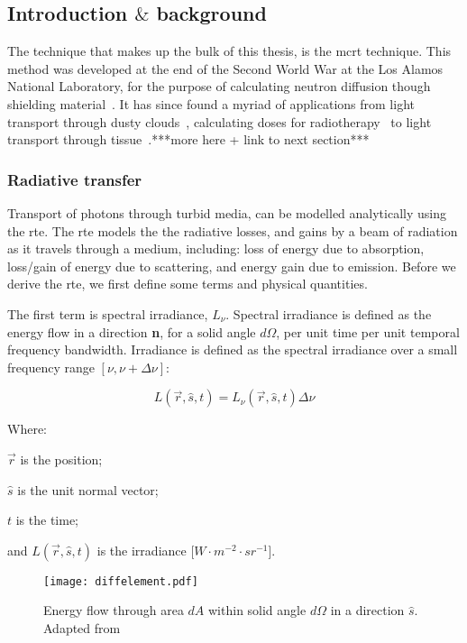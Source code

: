 \subsection{Introduction \texorpdfstring{$\&$}{and} background}
The technique that makes up the bulk of this thesis, is the \gls{mcrt} technique. This method was developed at the end of the Second World War at the Los Alamos National Laboratory, for the purpose of calculating neutron diffusion though shielding material~\cite{montybeg1,eckhardt1987stan,anderson1986metropolis,ulam1947statistical}. It has since found a myriad of applications from light transport through dusty clouds~\cite{wood1999model}, calculating doses for radiotherapy~\cite{rogers1995beam} to light transport through tissue~\cite{1stmonty}.***more here + link to next section***



\subsubsection*{Radiative transfer}
Transport of photons through turbid media, can be modelled analytically using the \gls{rte}. The \gls{rte} models the the radiative losses, and gains by a beam of radiation as it travels through a medium, including: loss of energy due to absorption, loss/gain of energy due to scattering, and energy gain due to emission. Before we derive the \gls{rte}, we first define some terms and physical quantities.


The first term is spectral irradiance, $L_\nu$. Spectral irradiance is defined as the energy flow in a direction \textbf{n}, for a solid angle $d\Omega$, per unit time per unit temporal frequency bandwidth.	
Irradiance is defined as the spectral irradiance over a small frequency range $[\nu, \nu+\Delta \nu]$:

\begin{equation}
	L(\vec{r},\hat{s},t) = L_{\nu}(\vec{r},\hat{s},t)\Delta \nu	
\end{equation}

\noindent Where:

\indent $\vec{r}$ is the position;

\indent $\hat{s}$ is the unit normal vector;

\indent $t$ is the time;

\indent and $L(\vec{r},\hat{s},t)$ is the irradiance [$W \cdot m^{-2}\cdot sr^{-1}$].

\medskip

\begin{figure}[!htb]
	\centering
	\texttt{[image: diffelement.pdf]}
	\caption{Energy flow through area $dA$ within solid angle $d\Omega$ in a direction $\hat{s}$. Adapted from~\cite{wang2012biomedical,chandrasekhar2013radiative}}
	\label{fig:energydiag1}
\end{figure}

